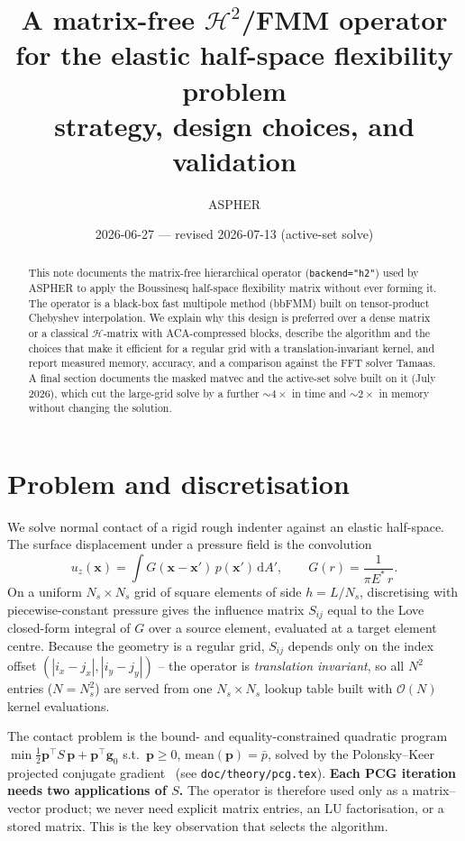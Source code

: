 \documentclass[11pt,a4paper]{article}
\title{A matrix-free $\mathcal{H}^2$/FMM operator for the elastic
half-space flexibility problem\\[2pt]
\large strategy, design choices, and validation}
\author{ASPHER}
\date{2026-06-27 --- revised 2026-07-13 (active-set solve)}
\newcommand{\Es}{E^{*}}
\newcommand{\Order}{\mathcal{O}}
\begin{document}
\maketitle

\begin{abstract}
This note documents the matrix-free hierarchical operator
(\texttt{backend="h2"}) used by ASPHER to apply the Boussinesq half-space
flexibility matrix without ever forming it. The operator is a black-box
fast multipole method (bbFMM) built on tensor-product Chebyshev
interpolation. We explain why this design is preferred over a dense matrix
or a classical $\mathcal{H}$-matrix with ACA-compressed blocks, describe the
algorithm and the choices that make it efficient for a regular grid with a
translation-invariant kernel, and report measured memory, accuracy, and a
comparison against the FFT solver Tamaas. A final section documents the
masked matvec and the active-set solve built on it (July 2026), which cut the
large-grid solve by a further $\sim\!4\times$ in time and $\sim\!2\times$ in
memory without changing the solution.
\end{abstract}

\section{Problem and discretisation}

We solve normal contact of a rigid rough indenter against an elastic
half-space. The surface displacement under a pressure field is the
convolution
\begin{equation}
  u_z(\mathbf{x}) = \int G(\mathbf{x}-\mathbf{x}')\,p(\mathbf{x}')\,\mathrm{d}A',
  \qquad
  G(r) = \frac{1}{\pi \Es\, r}.
\end{equation}
On a uniform $N_s\times N_s$ grid of square elements of side $h=L/N_s$,
discretising with piecewise-constant pressure gives the influence
matrix $S_{ij}$ equal to the Love~\cite{Love1929} closed-form integral of $G$
over a source element, evaluated at a target element centre. Because the geometry
is a regular grid, $S_{ij}$ depends only on the index offset
$(|i_x-j_x|,|i_y-j_y|)$ -- the operator is \emph{translation invariant}, so
all $N^2$ entries ($N=N_s^2$) are served from one $N_s\times N_s$ lookup
table built with $\Order(N)$ kernel evaluations.

The contact problem is the bound- and equality-constrained quadratic
program $\min \tfrac12 \mathbf{p}^\top S\,\mathbf{p} + \mathbf{p}^\top
\mathbf{g}_0$ s.t.\ $\mathbf{p}\ge 0$, $\mathrm{mean}(\mathbf{p})=\bar p$,
solved by the Polonsky--Keer projected conjugate gradient~\cite{PolKeer1999}
(see \texttt{doc/theory/pcg.tex}). \textbf{Each PCG iteration needs two
applications of $S$.} The operator is therefore used only as a
matrix--vector product; we never need explicit matrix entries, an LU
factorisation, or a stored matrix. This is the key observation that selects
the algorithm.
\end{document}
